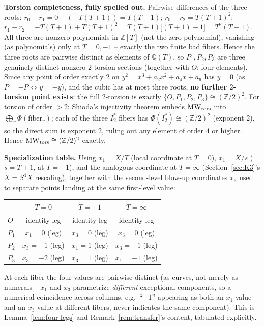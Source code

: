 \documentclass[11pt]{amsart}
\theoremstyle{definition}
\newcommand{\Q}{\mathbb{Q}}
\newcommand{\Z}{\mathbb{Z}}
\begin{document}
\textbf{Torsion completeness, fully spelled out.} Pairwise differences of
the three roots: $r_0-r_1=0-(-T(T+1))=T(T+1)$; $r_0-r_2=T(T+1)^2$;
$r_1-r_2=-T(T+1)+T(T+1)^2=T(T+1)\bigl[(T+1)-1\bigr]=T^2(T+1)$. All three
are nonzero polynomials in $\Z[T]$ (not the zero polynomial), vanishing
(as polynomials) only at $T=0,-1$ -- exactly the two finite bad fibers.
Hence the three roots are pairwise distinct as elements of $\Q(T)$, so
$P_1,P_2,P_3$ are three genuinely distinct nonzero $2$-torsion sections
(together with $O$: four elements). Since any point of order exactly $2$
on $y^2=x^3+a_2x^2+a_4x+a_6$ has $y=0$ (as $P=-P\Leftrightarrow y=-y$),
and the cubic has at most three roots, \textbf{no further $2$-torsion
point exists}: the full $2$-torsion is exactly $\{O,P_1,P_2,P_3\}\cong(\Z/2)^2$.
For torsion of order $>2$: Shioda's injectivity theorem embeds
$\mathrm{MW}_{\rm tors}$ into $\bigoplus_v\Phi(\text{fiber}_v)$; each of
the three $I_2^*$ fibers has $\Phi(I_2^*)\cong(\Z/2)^2$ (exponent $2$), so
the direct sum is exponent $2$, ruling out any element of order $4$ or
higher. Hence $\mathrm{MW}_{\rm tors}\cong(\Z/2)^2$ exactly.

\textbf{Specialization table.} Using $x_1=X/T$ (local coordinate at
$T=0$), $x_1=X/s$ ($s=T+1$, at $T=-1$), and the analogous coordinate at
$T=\infty$ (Section~\ref{sec:K3}'s $\tilde X=S^4X$ rescaling), together
with the second-level blow-up coordinates $x_3$ used to separate points
landing at the same first-level value:

\begin{center}
\begin{tabular}{l|c|c|c}
 & $T=0$ & $T=-1$ & $T=\infty$\\\hline
$O$ & identity leg & identity leg & identity leg\\
$P_1$ & $x_1=0$ (leg) & $x_3=0$ (leg) & $x_3=0$ (leg)\\
$P_2$ & $x_3=-1$ (leg) & $x_1=1$ (leg) & $x_3=-1$ (leg)\\
$P_3$ & $x_3=-2$ (leg) & $x_3=1$ (leg) & $x_1=-1$ (leg)\\
\end{tabular}
\end{center}

At each fiber the four values are pairwise distinct (as curves, not
merely as numerals -- $x_1$ and $x_3$ parametrize \emph{different}
exceptional components, so a numerical coincidence across columns, e.g.\
``$-1$'' appearing as both an $x_1$-value and an $x_3$-value at different
fibers, never indicates the same component). This is Lemma~\ref{lem:four-legs}
and Remark~\ref{rem:transfer}'s content, tabulated explicitly.
\end{document}
